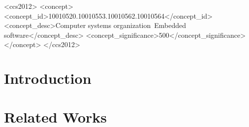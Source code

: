 \documentclass{sig-alternate-05-2015}
\begin{document}
{       %
}

\maketitle



\begin{CCSXML}
	<ccs2012>
	<concept>
	<concept_id>10010520.10010553.10010562.10010564</concept_id>
	<concept_desc>Computer systems organization~Embedded software</concept_desc>
	<concept_significance>500</concept_significance>
	</concept>
	</ccs2012>
\end{CCSXML}


%



\section{Introduction}\label{introduction}


\section{Related Works}\label{related} 

\end{document}
